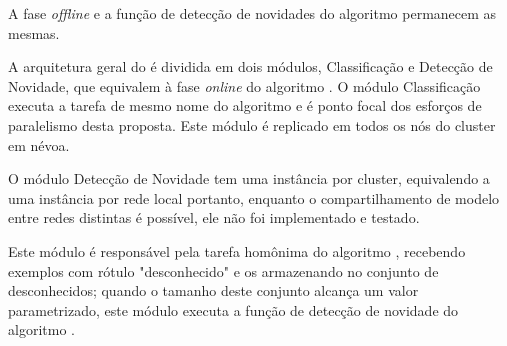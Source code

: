 A fase \emph{offline} e a função de detecção de novidades do algoritmo \minas
permanecem as mesmas.



A arquitetura geral do \mfog é dividida em dois módulos, Classificação e
Detecção de Novidade, que equivalem à fase \emph{online} do algoritmo \minas.
O módulo Classificação executa a tarefa de mesmo nome do algoritmo \minas e é
ponto focal dos esforços de paralelismo desta proposta.
Este módulo é replicado em todos os nós do cluster %
em névoa.

O módulo Detecção de Novidade tem uma instância por cluster, equivalendo a uma
instância por rede local portanto, enquanto o compartilhamento de modelo entre
redes distintas é possível, ele não foi implementado e testado.

Este módulo é responsável pela tarefa homônima do algoritmo \minas, recebendo
exemplos com rótulo "desconhecido" e os armazenando no conjunto de
desconhecidos; quando o tamanho deste conjunto alcança um valor parametrizado,
este módulo executa a função de detecção de novidade do algoritmo \minas.

